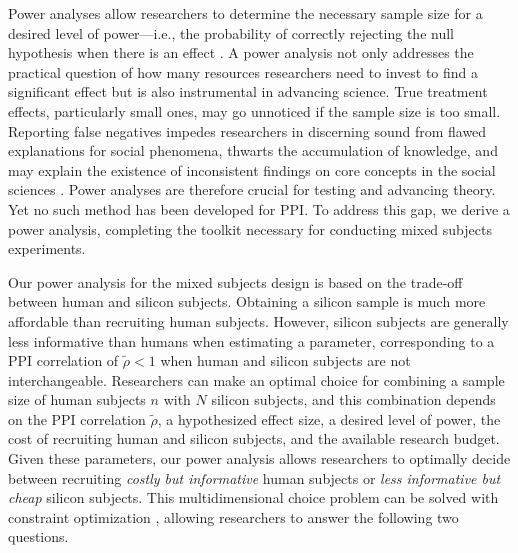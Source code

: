 \documentclass{article}
\begin{document}
Power analyses allow researchers to determine the necessary sample size for a desired level of power---i.e., the probability of correctly rejecting the null hypothesis when there is an effect \citep{cohen_statistical_1988}.  A power analysis not only addresses the practical question of how many resources researchers need to invest to find a significant effect but is also instrumental in advancing science. True treatment effects, particularly small ones, may go unnoticed if the sample size is too small. Reporting false negatives impedes researchers in discerning sound from flawed explanations for social phenomena, thwarts the accumulation of knowledge, and may explain the existence of inconsistent findings on core concepts in the social sciences \citep{thye_reliability_2000,stadtfeld_statistical_2020}. Power analyses are therefore crucial for testing and advancing theory. Yet no such method has been developed for PPI. To address this gap, we derive a power analysis, completing the toolkit necessary for conducting mixed subjects experiments.

Our power analysis for the mixed subjects design is based on the trade-off between human and silicon subjects. Obtaining a silicon sample is much more affordable than recruiting human subjects. However, silicon subjects are generally less informative than humans when estimating a parameter, corresponding to a PPI correlation of $\tilde{\rho} < 1$ when human and silicon subjects are not interchangeable. 
Researchers can make an optimal choice for combining a sample size of human subjects $n$ with $N$ silicon subjects, and this combination depends on the PPI correlation $\tilde{\rho}$, a hypothesized effect size, a desired level of power, the cost of recruiting human and silicon subjects, and the available research budget. Given these parameters, our power analysis allows researchers to optimally decide between recruiting \textit{costly but informative} human subjects or \textit{less informative but cheap} silicon subjects.
This multidimensional choice problem can be solved with constraint optimization \citep{apostol_calculus_1969}, allowing researchers to answer the following two questions.
\end{document}
